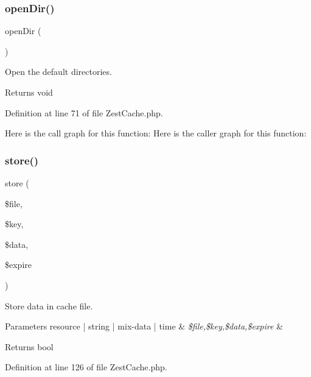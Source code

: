 \subsubsection{\texorpdfstring{open\+Dir()}{openDir()}}
{\footnotesize\ttfamily open\+Dir (\begin{DoxyParamCaption}{ }\end{DoxyParamCaption})}

Open the default directories.

\begin{DoxyReturn}{Returns}
void 
\end{DoxyReturn}


Definition at line 71 of file Zest\+Cache.\+php.

Here is the call graph for this function\+:
Here is the caller graph for this function\+:
\mbox{\label{class_zest_1_1_cache_1_1_zest_cache_1_1_zest_cache_a20403422dcbb1e348d4c077b15bbfaea}} 
\subsubsection{\texorpdfstring{store()}{store()}}
{\footnotesize\ttfamily store (\begin{DoxyParamCaption}\item[{}]{\$file,  }\item[{}]{\$key,  }\item[{}]{\$data,  }\item[{}]{\$expire }\end{DoxyParamCaption})}

Store data in cache file.


\begin{DoxyParams}[1]{Parameters}
resource | string | mix-\/data | time & {\em \$file,\$key,\$data,\$expire} & \\
\hline
\end{DoxyParams}
\begin{DoxyReturn}{Returns}
bool 
\end{DoxyReturn}


Definition at line 126 of file Zest\+Cache.\+php.

\mbox{\label{class_zest_1_1_cache_1_1_zest_cache_1_1_zest_cache_a1908e580493f970d18a429b5ec0e789f}} 
